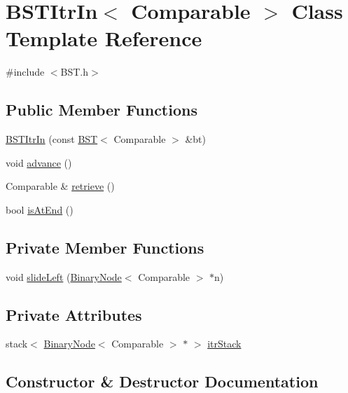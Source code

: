 \hypertarget{class_b_s_t_itr_in}{}\section{B\+S\+T\+Itr\+In$<$ Comparable $>$ Class Template Reference}
\label{class_b_s_t_itr_in}


{\ttfamily \#include $<$B\+S\+T.\+h$>$}

\subsection*{Public Member Functions}
\begin{DoxyCompactItemize}
\item 
\hyperlink{class_b_s_t_itr_in_ac836e2f560fed9cc7ef8e5431a2836cc}{B\+S\+T\+Itr\+In} (const \hyperlink{class_b_s_t}{B\+S\+T}$<$ Comparable $>$ \&bt)
\item 
void \hyperlink{class_b_s_t_itr_in_ac772d3ebbac748c5f8cf9bc659f2e32c}{advance} ()
\item 
Comparable \& \hyperlink{class_b_s_t_itr_in_ac7ac215c1247bd25fc1fdb8053826a32}{retrieve} ()
\item 
bool \hyperlink{class_b_s_t_itr_in_a6f9a43217862c263a9bf15b9a08b889a}{is\+At\+End} ()
\end{DoxyCompactItemize}
\subsection*{Private Member Functions}
\begin{DoxyCompactItemize}
\item 
void \hyperlink{class_b_s_t_itr_in_a896191c02da37364153df2363ff28e7e}{slide\+Left} (\hyperlink{class_binary_node}{Binary\+Node}$<$ Comparable $>$ $\ast$n)
\end{DoxyCompactItemize}
\subsection*{Private Attributes}
\begin{DoxyCompactItemize}
\item 
stack$<$ \hyperlink{class_binary_node}{Binary\+Node}$<$ Comparable $>$ $\ast$ $>$ \hyperlink{class_b_s_t_itr_in_ad7cb5e89f04cf08f5615aa53614dd916}{itr\+Stack}
\end{DoxyCompactItemize}


\subsection{Constructor \& Destructor Documentation}
\hypertarget{class_b_s_t_itr_in_ac836e2f560fed9cc7ef8e5431a2836cc}{}
